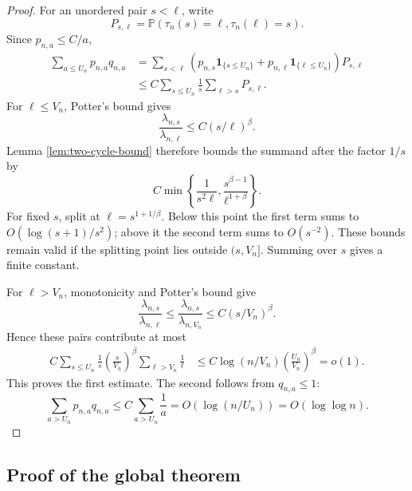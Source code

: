 \documentclass[11pt]{article}
\theoremstyle{remark}
\newcommand{\Pp}{\mathbb P}
\newcommand{\one}{\mathbf 1}
\begin{document}
\begin{proof}
For an unordered pair $s<\ell$, write
\[
        P_{s,\ell}=
        \Pp(\tau_n(s)=\ell,\tau_n(\ell)=s).
\]
Since $p_{n,a}\le C/a$,
\[
\begin{aligned}
        \sum_{a\le U_n}p_{n,a}q_{n,a}
        &=\sum_{s<\ell}
        \left(p_{n,s}\one_{\{s\le U_n\}}
        +p_{n,\ell}\one_{\{\ell\le U_n\}}\right)P_{s,\ell}\\
        &\le C\sum_{s\le U_n}\frac1s
        \sum_{\ell>s}P_{s,\ell}.
\end{aligned}
\]
For $\ell\le V_n$, Potter's bound gives
\[
        \frac{\lambda_{n,s}}{\lambda_{n,\ell}}
        \le C(s/\ell)^\beta.
\]
Lemma \ref{lem:two-cycle-bound} therefore bounds the summand after the factor
$1/s$ by
\[
        C\min\left\{\frac1{s^2\ell},
        \frac{s^{\beta-1}}{\ell^{1+\beta}}\right\}.
\]
For fixed $s$, split at $\ell=s^{1+1/\beta}$.  Below this point the first term
sums to $O(\log(s+1)/s^2)$; above it the second term sums to $O(s^{-2})$.
These bounds remain valid if the splitting point lies outside $(s,V_n]$.
Summing over $s$ gives a finite constant.

For $\ell>V_n$, monotonicity and Potter's bound give
\[
        \frac{\lambda_{n,s}}{\lambda_{n,\ell}}
        \le\frac{\lambda_{n,s}}{\lambda_{n,V_n}}
        \le C(s/V_n)^\beta.
\]
Hence these pairs contribute at most
\[
\begin{aligned}
        C\sum_{s\le U_n}\frac1s
        \left(\frac{s}{V_n}\right)^\beta
        \sum_{\ell>V_n}\frac1\ell
        &\le C\log(n/V_n)
        \left(\frac{U_n}{V_n}\right)^\beta=o(1).
\end{aligned}
\]
This proves the first estimate.  The second follows from $q_{n,a}\le1$:
\[
        \sum_{a>U_n}p_{n,a}q_{n,a}
        \le C\sum_{a>U_n}\frac1a
        =O(\log(n/U_n))=O(\log\log n).
\]
\end{proof}

\subsection{Proof of the global theorem}
\end{document}
